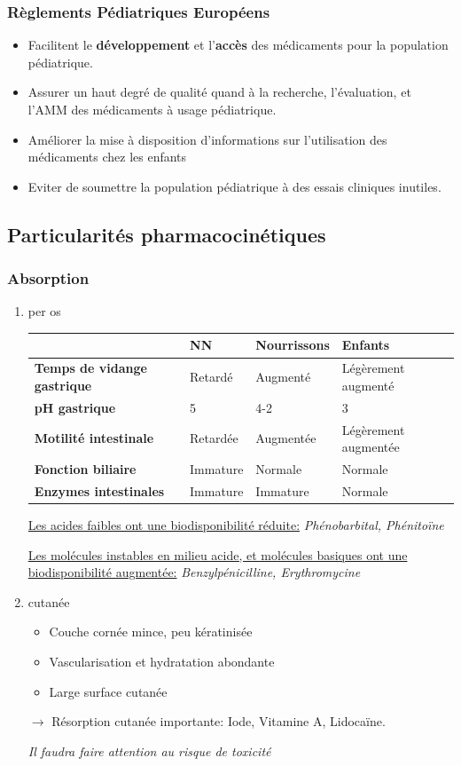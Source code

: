\documentclass[11pt]{article}
\begin{document}
\subsubsection{Règlements Pédiatriques Européens}
\label{sec:org66c4936}
\begin{itemize}
\item Facilitent le \textbf{développement} et l'\textbf{accès} des médicaments pour la population pédiatrique.
\item Assurer un haut degré de qualité quand à la recherche, l'évaluation, et l'AMM des médicaments à usage pédiatrique.
\item Améliorer la mise à disposition d'informations sur l'utilisation des médicaments chez les enfants
\item Eviter de soumettre la population pédiatrique à des essais cliniques inutiles.
\end{itemize}
\subsection{Particularités pharmacocinétiques}
\label{sec:org0dd22b2}
\subsubsection{Absorption}
\label{sec:org45d2b36}
\begin{enumerate}
\item per os
\label{sec:org9832923}
\begin{center}
\begin{tabular}{llll}
 & NN & Nourrissons & Enfants\\
\hline
\textbf{Temps de vidange gastrique} & Retardé & Augmenté & Légèrement augmenté\\
\textbf{pH gastrique} & 5 & 4-2 & 3\\
\textbf{Motilité intestinale} & Retardée & Augmentée & Légèrement augmentée\\
\textbf{Fonction biliaire} & Immature & Normale & Normale\\
\textbf{Enzymes intestinales}\footnotemark & Immature & Immature & Normale\\
\end{tabular}
\end{center}
\uline{Les acides faibles ont une biodisponibilité réduite:} \emph{Phénobarbital, Phénitoïne}

\uline{Les molécules instables en milieu acide, et molécules basiques  ont une biodisponibilité augmentée:} \emph{Benzylpénicilline, Erythromycine}
\item cutanée
\label{sec:orgd6895a2}
\begin{itemize}
\item Couche cornée mince, peu kératinisée
\item Vascularisation et hydratation abondante
\item Large surface cutanée
\end{itemize}
\(\to\) Résorption cutanée importante: Iode, Vitamine A, Lidocaïne.

\emph{Il faudra faire attention au risque de toxicité}
\end{enumerate}
\end{document}
